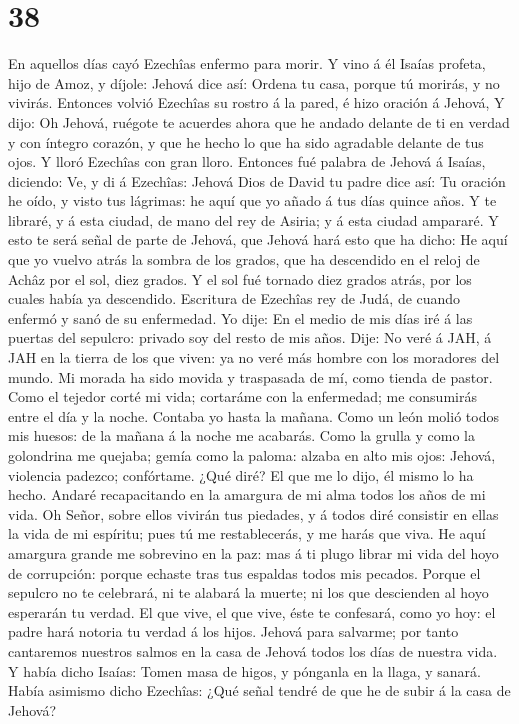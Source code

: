 \hypertarget{section-37}{%
\section{38}\label{section-37}}

 En aquellos días cayó Ezechîas enfermo para morir. Y vino á
él Isaías profeta, hijo de Amoz, y díjole: Jehová dice así: Ordena tu
casa, porque tú morirás, y no vivirás.  Entonces volvió
Ezechîas su rostro á la pared, é hizo oración á Jehová,  Y
dijo: Oh Jehová, ruégote te acuerdes ahora que he andado delante de ti
en verdad y con íntegro corazón, y que he hecho lo que ha sido agradable
delante de tus ojos. Y lloró Ezechîas con gran lloro. 
Entonces fué palabra de Jehová á Isaías, diciendo:  Ve, y di
á Ezechîas: Jehová Dios de David tu padre dice así: Tu oración he oído,
y visto tus lágrimas: he aquí que yo añado á tus días quince años.
 Y te libraré, y á esta ciudad, de mano del rey de Asiria; y
á esta ciudad ampararé.  Y esto te será señal de parte de
Jehová, que Jehová hará esto que ha dicho:  He aquí que yo
vuelvo atrás la sombra de los grados, que ha descendido en el reloj de
Achâz por el sol, diez grados. Y el sol fué tornado diez grados atrás,
por los cuales había ya descendido.  Escritura de Ezechîas
rey de Judá, de cuando enfermó y sanó de su enfermedad.  Yo
dije: En el medio de mis días iré á las puertas del sepulcro: privado
soy del resto de mis años.  Dije: No veré á JAH, á JAH en
la tierra de los que viven: ya no veré más hombre con los moradores del
mundo.  Mi morada ha sido movida y traspasada de mí, como
tienda de pastor. Como el tejedor corté mi vida; cortaráme con la
enfermedad; me consumirás entre el día y la noche.  Contaba
yo hasta la mañana. Como un león molió todos mis huesos: de la mañana á
la noche me acabarás.  Como la grulla y como la golondrina
me quejaba; gemía como la paloma: alzaba en alto mis ojos: Jehová,
violencia padezco; confórtame.  ¿Qué diré? El que me lo
dijo, él mismo lo ha hecho. Andaré recapacitando en la amargura de mi
alma todos los años de mi vida.  Oh Señor, sobre ellos
vivirán tus piedades, y á todos diré consistir en ellas la vida de mi
espíritu; pues tú me restablecerás, y me harás que viva. 
He aquí amargura grande me sobrevino en la paz: mas á ti plugo librar mi
vida del hoyo de corrupción: porque echaste tras tus espaldas todos mis
pecados.  Porque el sepulcro no te celebrará, ni te alabará
la muerte; ni los que descienden al hoyo esperarán tu verdad.
 El que vive, el que vive, éste te confesará, como yo hoy:
el padre hará notoria tu verdad á los hijos.  Jehová para
salvarme; por tanto cantaremos nuestros salmos en la casa de Jehová
todos los días de nuestra vida.  Y había dicho Isaías:
Tomen masa de higos, y pónganla en la llaga, y sanará. 
Había asimismo dicho Ezechîas: ¿Qué señal tendré de que he de subir á la
casa de Jehová?

